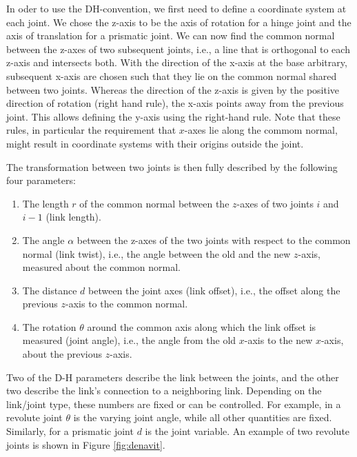 In oder to use the DH-convention, we first need to define a coordinate system at each joint. We chose the z-axis to be the axis of rotation for a hinge joint and the axis of translation for a prismatic joint. We can now find the common normal between the z-axes of two subsequent joints, i.e., a line that is orthogonal to each z-axis and intersects both. With the direction of the x-axis at the base arbitrary, subsequent x-axis are chosen such that they lie on the common normal shared between two joints. Whereas the direction of the z-axis is given by the positive direction of rotation (right hand rule), the x-axis points away from the previous joint. This allows defining the y-axis using the right-hand rule. Note that these rules, in particular the requirement that $x$-axes lie along the commom normal, might result in coordinate systems with their origins outside the joint. %

The transformation between two joints is then fully described by the following four parameters:
\begin{enumerate}
\item The length $ r$ of the common normal between the $z$-axes of two joints $i$ and $i-1$ (link length).
\item The angle $ \alpha$ between the z-axes of the two joints with respect to the common normal (link twist), i.e., the angle between the old and the new $z$-axis, measured about the common normal.
\item The distance $d$ between the joint axes (link offset), i.e., the offset along the previous $z$-axis to the common normal.
\item The rotation $ \theta$ around the common axis along which the link offset is measured (joint angle), i.e., the angle from the old $x$-axis to the new $x$-axis, about the previous $z$-axis.
\end{enumerate}

Two of the D-H parameters describe the link between the joints, and the other two describe the link's connection to a neighboring link. Depending on the link/joint type, these numbers are fixed or can be controlled. For example, in a revolute joint $ \theta$ is the varying joint angle, while all other quantities are fixed.  Similarly, for a prismatic joint $ d$ is the joint variable. An example of two revolute joints is shown in Figure \ref{fig:denavit}.

